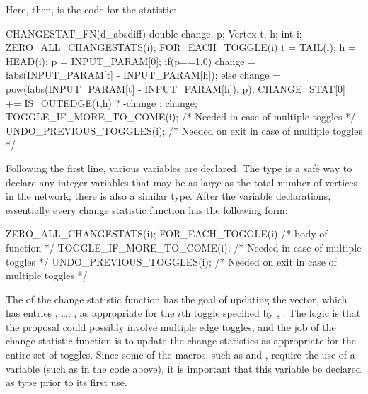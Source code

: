 \documentclass[nojss]{jss}
\begin{document}
Here, then, is the code for the  statistic:
\begin{CodeChunk}
\begin{CodeInput}
CHANGESTAT_FN(d_absdiff) {
  double change, p; Vertex t, h; int i;
  ZERO_ALL_CHANGESTATS(i);
  FOR_EACH_TOGGLE(i) {
    t = TAIL(i); h = HEAD(i);
    p = INPUT_PARAM[0];
    if(p==1.0){
      change = fabs(INPUT_PARAM[t] - INPUT_PARAM[h]);
    }else{
      change = pow(fabs(INPUT_PARAM[t] - INPUT_PARAM[h]), p);
    }
    CHANGE_STAT[0] += IS_OUTEDGE(t,h) ? -change : change;
    TOGGLE_IF_MORE_TO_COME(i); /* Needed in case of multiple toggles */
  }
  UNDO_PREVIOUS_TOGGLES(i); /* Needed on exit in case of multiple toggles */
}
\end{CodeInput}
\end{CodeChunk}
Following the first line, various variables are declared.  The  type
is a safe way to declare any integer variables that may be as large as the total number of
vertices in the network; there is also a similar  type.
After the variable declarations, essentially every change statistic function has the following
form:
\begin{CodeChunk}
\begin{CodeInput}
  ZERO_ALL_CHANGESTATS(i);
  FOR_EACH_TOGGLE(i) {
    /* body of function */
    TOGGLE_IF_MORE_TO_COME(i); /* Needed in case of multiple toggles */
  }
  UNDO_PREVIOUS_TOGGLES(i); /* Needed on exit in case of multiple toggles */
\end{CodeInput}
\end{CodeChunk}
The  of the change statistic function has the goal of
updating the  vector, which has entries
, \ldots,
,
as appropriate for the $i$th toggle specified by
, .  The logic is that the proposal could possibly involve
multiple edge toggles, and the job of the change statistic function is to update the
change statistics as appropriate for the entire set of toggles.
Since some of the macros, such as  and
,
 require the use of a variable (such as  in the code above), it is important
 that this variable be declared as type  prior to its first use.
\end{document}
